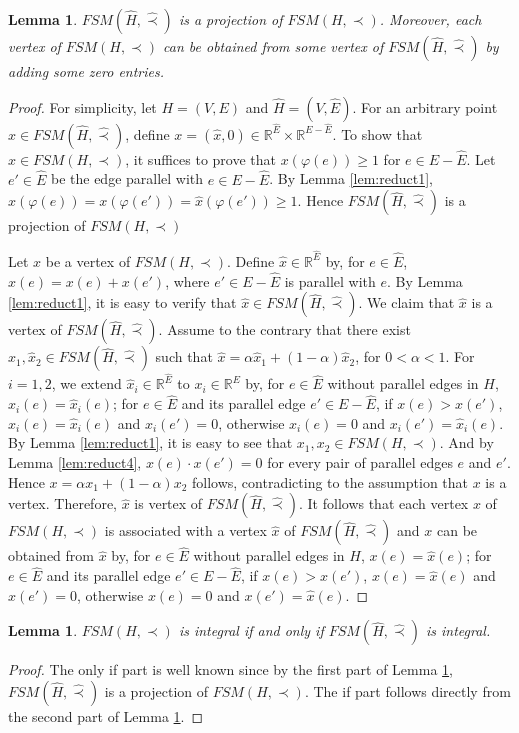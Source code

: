\documentclass[11pt]{article}
\newtheorem{lemma}[theorem]{Lemma}
\numberwithin{theorem}{section}
\begin{document}
\begin{lemma}
\label{lem:reduct5}
$FSM(\hat{H},\hat\prec)$ is a projection of $FSM(H,\prec)$. Moreover, each vertex of $FSM(H,\prec)$ can be obtained from some vertex of $FSM(\hat{H},\hat\prec)$ by adding some zero entries. 
\end{lemma}
\begin{proof}
For simplicity, let $H=(V,E)$ and $\hat{H}=(V,\hat{E})$.
For an arbitrary point $\hat{x}\in FSM(\hat{H},\hat\prec)$, define $x=(\hat{x},0)\in \mathbb{R}^{\hat{E}}\times \mathbb{R}^{E-\hat{E}}$. To show that $x\in FSM(H,\prec)$, it suffices to prove that $x(\varphi(e))\geq 1$ for $e\in E-\hat{E}$. Let $e'\in \hat{E}$ be the edge parallel with $e\in E-\hat{E}$. By Lemma \ref{lem:reduct1}, $x(\varphi(e))=x(\varphi(e'))=\hat{x}(\varphi(e'))\geq 1$. Hence $FSM(\hat{H},\hat\prec)$ is a projection of $FSM(H,\prec)$

Let $x$ be a vertex of $FSM(H,\prec)$. Define $\hat{x}\in \mathbb{R}^{\hat{E}}$ by, for $e\in \hat{E}$, $\hat{x}(e)=x(e)+x(e')$, where $e'\in E-\hat{E}$ is parallel with $e$. By Lemma \ref{lem:reduct1}, it is easy to verify that $\hat{x}\in FSM(\hat{H},\hat\prec)$. We claim that $\hat{x}$ is a vertex of $FSM(\hat{H},\hat\prec)$. Assume to the contrary that there exist $\hat{x}_1, \hat{x}_2 \in FSM(\hat{H},\hat\prec)$ such that $\hat{x}=\alpha \hat{x}_1+ (1-\alpha)\hat{x}_2$, for $0<\alpha<1$. For $i=1,2$, we extend $\hat{x}_i\in \mathbb{R}^{\hat{E}}$ to $x_i\in \mathbb{R}^{E}$ by, for $e\in \hat{E}$ without parallel edges in $H$, $x_i(e)=\hat{x}_i(e)$; for $e\in\hat{E}$ and its parallel edge $e'\in E-\hat{E}$, if $x(e)>x(e')$, $x_i(e)=\hat{x}_i(e)$ and $x_i(e')=0$, otherwise $x_i(e)=0$ and $x_i(e')=\hat{x}_i(e)$. By Lemma \ref{lem:reduct1}, it is easy to see that $x_1,x_2\in FSM(H,\prec)$. And by Lemma \ref{lem:reduct4}, $x(e)\cdot x(e')=0$ for every pair of parallel edges $e$ and $e'$. Hence $x=\alpha x_1+(1-\alpha) x_2$ follows, contradicting to the assumption that $x$ is a vertex. Therefore, $\hat{x}$ is vertex of $FSM(\hat{H},\hat\prec)$. It follows that each vertex $x$ of $FSM(H,\prec)$ is associated with a vertex $\hat{x}$ of $FSM(\hat{H},\hat\prec)$ and $x$ can be obtained from $\hat{x}$ by, for $e\in \hat{E}$ without parallel edges in $H$, $x(e)=\hat{x}(e)$; for $e\in\hat{E}$ and its parallel edge $e'\in E-\hat{E}$, if $x(e)>x(e')$, $x(e)=\hat{x}(e)$ and $x(e')=0$, otherwise $x(e)=0$ and $x(e')=\hat{x}(e)$. 
\end{proof}

\begin{lemma}
\label{lem:reduct6}
$FSM(H,\prec)$ is integral if and only if $FSM(\hat{H},\hat\prec)$ is integral.
\end{lemma}
\begin{proof}
The only if part is well known since by the first part of Lemma \ref{lem:reduct5}, $FSM(\hat{H},\hat\prec)$ is a projection of $FSM(H,\prec)$. The if part follows directly from the second part of Lemma \ref{lem:reduct5}.
\end{proof}
\end{document}
